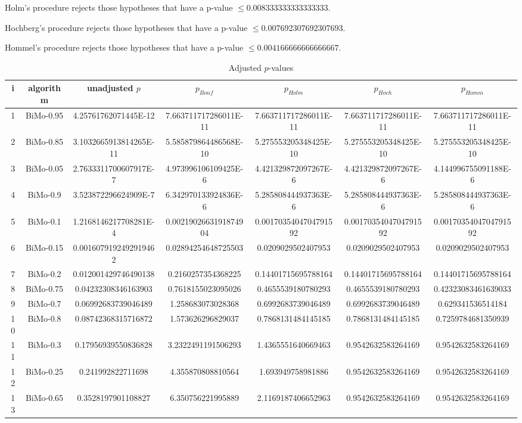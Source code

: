 \documentclass[a4paper,10pt]{article}
\begin{document}
\begin{landscape}
Holm's procedure rejects those hypotheses that have a p-value $\le0.008333333333333333$.


Hochberg's procedure rejects those hypotheses that have a p-value $\le0.007692307692307693$.


Hommel's procedure rejects those hypotheses that have a p-value $\le0.004166666666666667$.


\begin{table}[!htp]
\centering\tiny
\caption{Adjusted $p$-values}
\begin{tabular}{ccccccc}
i&algorithm&unadjusted $p$&$p_{Bonf}$&$p_{Holm}$&$p_{Hoch}$&$p_{Homm}$\\
\hline
1&BiMo-0.95&4.25761762071445E-12&7.663711717286011E-11&7.663711717286011E-11&7.663711717286011E-11&7.663711717286011E-11\\
2&BiMo-0.85&3.1032665913814265E-11&5.585879864486568E-10&5.275553205348425E-10&5.275553205348425E-10&5.275553205348425E-10\\
3&BiMo-0.05&2.7633311700607917E-7&4.973996106109425E-6&4.421329872097267E-6&4.421329872097267E-6&4.144996755091188E-6\\
4&BiMo-0.9&3.523872296624909E-7&6.342970133924836E-6&5.285808444937363E-6&5.285808444937363E-6&5.285808444937363E-6\\
5&BiMo-0.1&1.2168146217708281E-4&0.0021902663191874904&0.0017035404704791592&0.0017035404704791592&0.0017035404704791592\\
6&BiMo-0.15&0.0016079192492919462&0.02894254648725503&0.0209029502407953&0.0209029502407953&0.0209029502407953\\
7&BiMo-0.2&0.012001429746490138&0.2160257354368225&0.14401715695788164&0.14401715695788164&0.14401715695788164\\
8&BiMo-0.75&0.04232308346163903&0.7618155023095026&0.4655539180780293&0.4655539180780293&0.42323083461639033\\
9&BiMo-0.7&0.06992683739046489&1.258683073028368&0.6992683739046489&0.6992683739046489&0.629341536514184\\
10&BiMo-0.8&0.08742368315716872&1.573626296829037&0.7868131484145185&0.7868131484145185&0.7259784681350939\\
11&BiMo-0.3&0.17956939550836828&3.2322491191506293&1.4365551640669463&0.9542632583264169&0.9542632583264169\\
12&BiMo-0.25&0.241992822711698&4.355870808810564&1.693949758981886&0.9542632583264169&0.9542632583264169\\
13&BiMo-0.65&0.3528197901108827&6.350756221995889&2.1169187406652963&0.9542632583264169&0.9542632583264169\\

\end{tabular}
\end{table}
\end{landscape}
\end{document}
